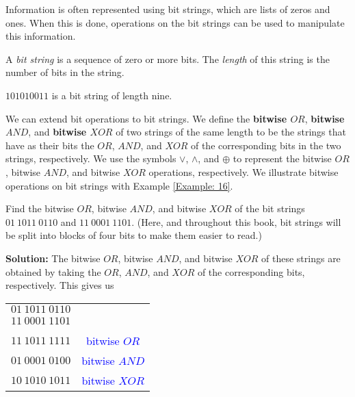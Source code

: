 \documentclass{Axon}
\begin{document}
Information is often represented using bit strings, which are lists of zeros and ones. When this is done, operations on the bit strings can be used to manipulate this information.

\begin{definition}
    A \textit{bit string} is a sequence of zero or more bits. The \textit{length} of this string is the number of bits in the string.
\end{definition}

\begin{example}
    \(101010011\) is a bit string of length nine.
\end{example}

We can extend bit operations to bit strings. We define the \textbf{bitwise \(OR\)}, \textbf{bitwise \(AND\)}, and \textbf{bitwise \(XOR\)} of two strings of the same length to be the strings that have as their bits the \(OR\), \(AND\), and \(XOR\) of the corresponding bits in the two strings, respectively. We use the symbols \(\lor\), \(\land\), and \(\oplus\) to represent the bitwise \(OR\), bitwise \(AND\), and bitwise \(XOR\) operations, respectively. We illustrate bitwise operations on bit strings with Example \ref{Example: 16}.

\begin{example}\label{Example: 16}
    Find the bitwise \(OR\), bitwise \(AND\), and bitwise \(XOR\) of the bit strings \(01 \ 1011 \ 0110\) and \(11 \ 0001 \ 1101\). (Here, and throughout this book, bit strings will be split into blocks of four bits to make them easier to read.)

    \noindent
    \textbf{Solution:}
    The bitwise \(OR\), bitwise \(AND\), and bitwise \(XOR\) of these strings are obtained by taking the \(OR\), \(AND\), and \(XOR\) of the corresponding bits, respectively. This gives us
    
    \begin{tabular}{cc}
        \(01 \ 1011 \ 0110\) &                                   \\
        \(11 \ 0001 \ 1101\) &                                   \\
        \hline               &                                   \\
        \(11 \ 1011 \ 1111\) & \textcolor{blue}{bitwise \(OR\)}  \\
        \(01 \ 0001 \ 0100\) & \textcolor{blue}{bitwise \(AND\)} \\
        \(10 \ 1010 \ 1011\) & \textcolor{blue}{bitwise \(XOR\)}
    \end{tabular}
\end{example}

\printbibliography
\end{document}
